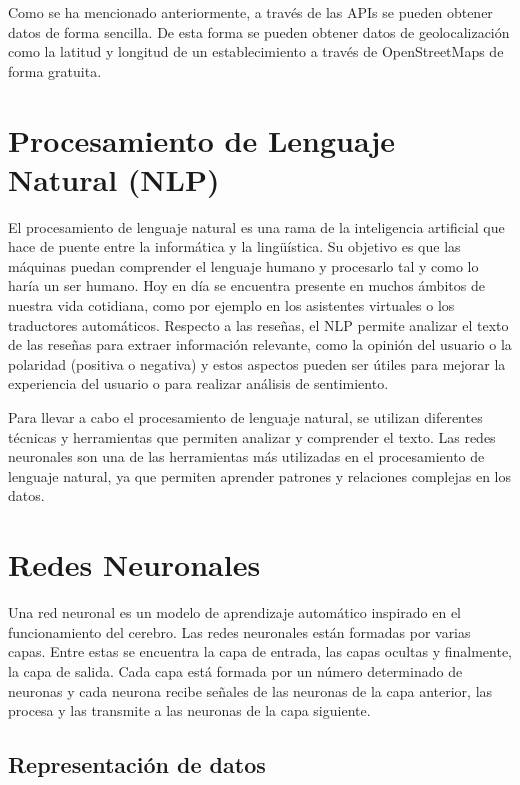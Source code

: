 Como se ha mencionado anteriormente, a través de las APIs se pueden obtener datos de forma sencilla.
De esta forma se pueden obtener datos de geolocalización como la latitud y longitud de un establecimiento a través de OpenStreetMaps de forma gratuita.

\section{Procesamiento de Lenguaje Natural (NLP)}

El procesamiento de lenguaje natural es una rama de la inteligencia artificial que hace de puente entre la informática y la lingüística. 
Su objetivo es que las máquinas puedan comprender el lenguaje humano y procesarlo tal y como lo haría un ser humano. \cite{udit:nlp}
Hoy en día se encuentra presente en muchos ámbitos de nuestra vida cotidiana, como por ejemplo en los asistentes virtuales o los traductores automáticos.
Respecto a las reseñas, el NLP permite analizar el texto de las reseñas para extraer información relevante, como la opinión del usuario o la polaridad (positiva o negativa) y estos aspectos pueden ser útiles para mejorar la experiencia del usuario o para realizar análisis de sentimiento.

Para llevar a cabo el procesamiento de lenguaje natural, se utilizan diferentes técnicas y herramientas que permiten analizar y comprender el texto.
Las redes neuronales son una de las herramientas más utilizadas en el procesamiento de lenguaje natural, ya que permiten aprender patrones y relaciones complejas en los datos.

\section{Redes Neuronales}

Una red neuronal es un modelo de aprendizaje automático inspirado en el funcionamiento del cerebro. \cite{google:nn}
Las redes neuronales están formadas por varias capas. Entre estas se encuentra la capa de entrada, las capas ocultas y finalmente, la capa de salida.
Cada capa está formada por un número determinado de neuronas y cada neurona recibe señales de las neuronas de la capa anterior, las procesa y las transmite a las neuronas de la capa siguiente.


\subsection{Representación de datos}


